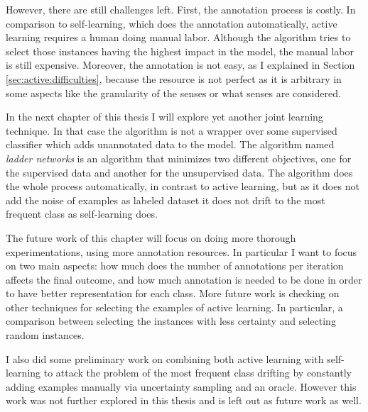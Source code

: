 However, there are still challenges left. First, the annotation process is
costly. In comparison to self-learning, which does the annotation
automatically, active learning requires a human doing manual labor. Although
the algorithm tries to select those instances having the highest impact in the
model, the manual labor is still expensive. Moreover, the annotation is not
easy, as I explained in Section \ref{sec:active:difficulties}, because the
resource is not perfect as it is arbitrary in some aspects like the granularity
of the senses or what senses are considered.

In the next chapter of this thesis I will explore yet another joint learning
technique. In that case the algorithm is not a wrapper over some supervised
classifier which adds unannotated data to the model. The algorithm named {\em
ladder networks} is an algorithm that minimizes two different objectives, one
for the supervised data and another for the unsupervised data. The algorithm
does the whole process automatically, in contrast to active learning, but as it
does not add the noise of examples as labeled dataset it does not drift to the
most frequent class as self-learning does.

The future work of this chapter will focus on doing more thorough
experimentations, using more annotation resources. In particular I want to
focus on two main aspects: how much does the number of annotations per
iteration affects the final outcome, and how much annotation is needed to be
done in order to have better representation for each class. More future work
is checking on other techniques for selecting the examples of active learning.
In particular, a comparison between selecting the instances with less certainty
and selecting random instances.

I also did some preliminary work on combining both active learning with
self-learning to attack the problem of the most frequent class drifting by
constantly adding examples manually via uncertainty sampling and an oracle.
However this work was not further explored in this thesis and is left out as
future work as well.

